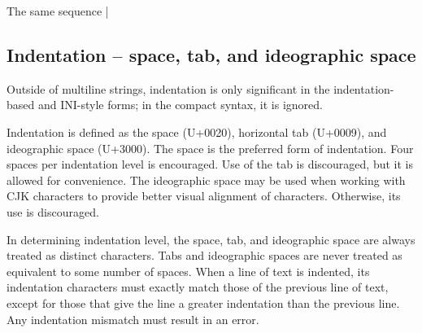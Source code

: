 \documentclass[11pt]{article}
\newcommand{\bespon}{BespON}
\begin{document}
The same sequence |%




\subsection{Indentation -- space, tab, and ideographic space}

Outside of multiline strings, indentation is only significant in the indentation-based and INI-style forms; in the compact syntax, it is ignored.

Indentation is defined as the space (U+0020), horizontal tab (U+0009), and ideographic space (U+3000).  The space is the preferred form of indentation.  Four spaces per indentation level is encouraged.  Use of the tab is discouraged, but it is allowed for convenience.  The ideographic space may be used when working with CJK characters to provide better visual alignment of characters.  Otherwise, its use is discouraged.

In determining indentation level, the space, tab, and ideographic space are always treated as distinct characters.  Tabs and ideographic spaces are never treated as equivalent to some number of spaces.  When a line of text is indented, its indentation characters must exactly match those of the previous line of text, except for those that give the line a greater indentation than the previous line.  Any indentation mismatch must result in an error.
\end{document}

